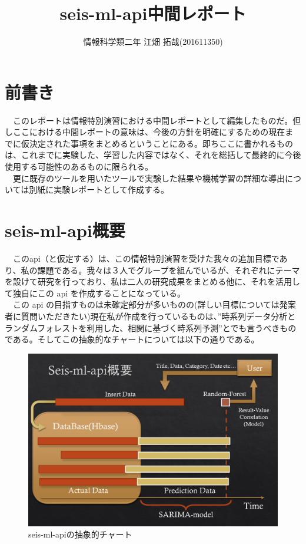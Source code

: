 \documentclass{scrartcl}
\author{情報科学類二年 江畑 拓哉(201611350)}
\date{}
\title{seis-ml-api中間レポート}
\begin{document}
\maketitle
\tableofcontents


\section{前書き}
\label{sec:org7d9b8de}
　このレポートは情報特別演習における中間レポートとして編集したものだ。但しここにおける中間レポートの意味は、今後の方針を明確にするための現在までに仮決定された事項をまとめるということにある。即ちここに書かれるものは、これまでに実験した、学習した内容ではなく、それを総括して最終的に今後使用する可能性のあるものに限られる。\\
　更に既存のツールを用いたツールで実験した結果や機械学習の詳細な導出については別紙に実験レポートとして作成する。\\

\section{seis-ml-api概要}
\label{sec:org8a814da}
　このapi（と仮定する）は、この情報特別演習を受けた我々の追加目標であり、私の課題である。我々は３人でグループを組んでいるが、それぞれにテーマを設けて研究を行っており、私は二人の研究成果をまとめる他に、それを活用して独自にこの api を作成することになっている。\\
　この api の目指すものは未確定部分が多いものの(詳しい目標については発案者に質問いただきたい)現在私が作成を行っているものは、”時系列データ分析とランダムフォレストを利用した、相関に基づく時系列予測”とでも言うべきものである。そしてこの抽象的なチャートについては以下の通りである。\\
\begin{figure}[htbp]
\centering
\includegraphics[width=15cm]{./idea-1.png}
\caption{seis-ml-apiの抽象的チャート}
\end{figure}
\end{document}
